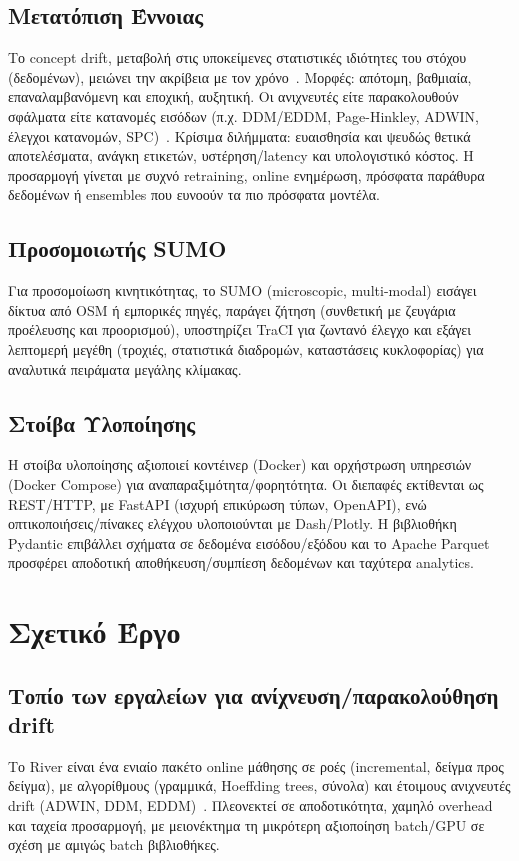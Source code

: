 \subsection*{Μετατόπιση Έννοιας}
Το concept drift, μεταβολή στις υποκείμενες στατιστικές ιδιότητες του στόχου (δεδομένων), μειώνει την ακρίβεια με τον χρόνο~\cite{lu2018learning}.
Μορφές: απότομη, βαθμιαία, επαναλαμβανόμενη και εποχική, αυξητική.
Οι ανιχνευτές είτε παρακολουθούν σφάλματα είτε κατανομές εισόδων (π.χ. DDM/EDDM, Page-Hinkley, ADWIN, έλεγχοι κατανομών, SPC)~\cite{bifet2007learning, page1954continuous, massey1951kolmogorov, montgomery2020spc}.
Κρίσιμα διλήμματα: ευαισθησία και ψευδώς θετικά αποτελέσματα, ανάγκη ετικετών, υστέρηση/latency και υπολογιστικό κόστος.
Η προσαρμογή γίνεται με συχνό retraining, online ενημέρωση, πρόσφατα παράθυρα δεδομένων ή ensembles που ευνοούν τα πιο πρόσφατα μοντέλα.

\subsection*{Προσομοιωτής SUMO}
Για προσομοίωση κινητικότητας, το SUMO (microscopic, multi-modal) εισάγει δίκτυα από OSM ή εμπορικές πηγές, παράγει ζήτηση (συνθετική με ζευγάρια προέλευσης και προορισμού), υποστηρίζει TraCI για ζωντανό έλεγχο και εξάγει λεπτομερή μεγέθη (τροχιές, στατιστικά διαδρομών, καταστάσεις κυκλοφορίας) για αναλυτικά πειράματα μεγάλης κλίμακας.

\subsection*{Στοίβα Υλοποίησης}
Η στοίβα υλοποίησης αξιοποιεί κοντέινερ (Docker) και ορχήστρωση υπηρεσιών (Docker Compose) για αναπαραξιμότητα/φορητότητα.
Οι διεπαφές εκτίθενται ως REST/HTTP, με FastAPI (ισχυρή επικύρωση τύπων, OpenAPI), ενώ οπτικοποιήσεις/πίνακες ελέγχου υλοποιούνται με Dash/Plotly. Η βιβλιοθήκη Pydantic επιβάλλει σχήματα σε δεδομένα εισόδου/εξόδου και το Apache Parquet προσφέρει αποδοτική αποθήκευση/συμπίεση δεδομένων και ταχύτερα analytics.

\section*{Σχετικό Έργο}

\subsection*{Τοπίο των εργαλείων για ανίχνευση/παρακολούθηση drift}
Το River είναι ένα ενιαίο πακέτο online μάθησης σε ροές (incremental, δείγμα προς δείγμα), με αλγορίθμους (γραμμικά, Hoeffding trees, σύνολα) και έτοιμους ανιχνευτές drift (ADWIN, DDM, EDDM)~\cite{river2021jmlr}.
Πλεονεκτεί σε αποδοτικότητα, χαμηλό overhead και ταχεία προσαρμογή, με μειονέκτημα τη μικρότερη αξιοποίηση batch/GPU σε σχέση με αμιγώς batch βιβλιοθήκες.

